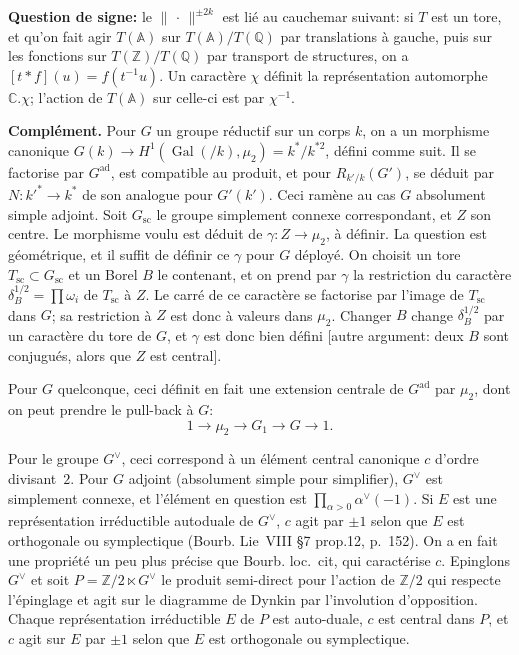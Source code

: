\documentclass[11pt,a4paper]{article}
\theoremstyle{plain}
\theoremstyle{definition}
\DeclareMathOperator{\Gal}{Gal}
\newcommand{\norm}[1]{\lVert#1\rVert}
\begin{document}
\smallskip
\textbf{Question de signe:} le $\norm{\,\cdot\,}^{\pm 2k}$ est li\'{e} au cauchemar suivant: si $T$ est un tore, et qu'on fait agir $T(\mathbb A)$ sur $T(\mathbb A)/T(\mathbb Q)$ par translations \`{a} gauche, puis sur les fonctions sur $T(\mathbb Z)/T(\mathbb Q)$ par transport de structures, on a $[t*f](u) = f(t^{-1}u)$. Un caract\`{e}re $\chi$ d\'{e}finit la repr\'{e}sentation automorphe $\mathbb C.\chi$; l'action de $T(\mathbb A)$ sur celle-ci est par $\chi^{-1}$.

\smallskip
\textbf{Compl\'{e}ment.} Pour $G$ un groupe r\'{e}ductif sur un corps $k$, on a un morphisme canonique $G(k) \to H^1(\Gal(/k),\mu_2) = k^*/k^{*2}$, d\'{e}fini comme suit. Il se factorise par $G^{\mathrm{ad}}$, est compatible au produit, et pour $R_{k'/k}(G')$, se d\'{e}duit par $N \colon k'^* \to k^*$ de son analogue pour $G'(k')$. Ceci ram\`{e}ne au cas $G$ absolument simple adjoint. Soit $G_{\mathrm{sc}}$ le groupe simplement connexe correspondant, et $Z$ son centre. Le morphisme voulu est d\'{e}duit de $\gamma \colon Z \to \mu_2$, \`{a} d\'{e}finir. La question est g\'{e}om\'{e}trique, et il suffit de d\'{e}finir ce $\gamma$ pour $G$ d\'{e}ploy\'{e}. On choisit un tore $T_{\mathrm{sc}} \subset G_{\mathrm{sc}}$ et un Borel $B$ le contenant, et on prend par $\gamma$ la restriction du caract\`{e}re $\delta_B^{1/2} = \prod \omega_i$ de $T_{\mathrm{sc}}$ \`{a} $Z$. Le carr\'{e} de ce caract\`{e}re se factorise par l'image de $T_{\mathrm{sc}}$ dans $G$; sa restriction \`{a} $Z$ est donc \`{a} valeurs dans $\mu_2$. Changer $B$ change $\delta_B^{1/2}$ par un caract\`{e}re du tore de $G$, et $\gamma$ est donc bien d\'{e}fini [autre argument: deux $B$ sont conjugu\'{e}s, alors que $Z$ est central].

Pour $G$ quelconque, ceci d\'{e}finit en fait une extension centrale de $G^{\mathrm{ad}}$ par $\mu_2$, dont on peut prendre le pull-back \`{a} $G$:
\[
1 \to \mu_2 \to G_1 \to G \to 1.
\]

Pour le groupe $G^\vee$, ceci correspond \`{a} un \'{e}l\'{e}ment central canonique $c$ d'ordre divisant~$2$. Pour $G$ adjoint (absolument simple pour simplifier), $G^\vee$ est simplement connexe, et l'\'{e}l\'{e}ment en question est $\prod\limits_{\alpha>0} \alpha^\vee(-1)$. Si $E$ est une repr\'{e}sentation irr\'{e}ductible autoduale de $G^\vee$, $c$ agit par $\pm 1$ selon que $E$ est orthogonale ou symplectique (Bourb. Lie~VIII \S7 prop.12, p.~152). On a en fait une propri\'{e}t\'{e} un peu plus pr\'{e}cise que Bourb. loc.~cit, qui caract\'{e}rise $c$. Epinglons $G^\vee$ et soit $P = \mathbb Z/2 \ltimes G^\vee$ le produit semi-direct pour l'action de $\mathbb Z/2$ qui respecte l'\'{e}pinglage et agit sur le diagramme de Dynkin par l'involution d'opposition. Chaque repr\'{e}sentation irr\'{e}ductible $E$ de $P$ est auto-duale, $c$ est central dans $P$, et $c$ agit sur $E$ par $\pm 1$ selon que $E$ est orthogonale ou symplectique.
\end{document}
